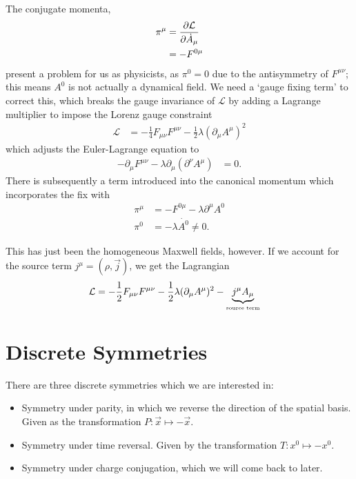 \documentclass[notes.tex]{subfiles}
\begin{document}
 The conjugate momenta,
 \begin{align*}
   \pi^\mu &= \pdv{\mathcal{L}}{\dot{A}_\mu}\\&=-F^{0\mu}
 \end{align*}
present a problem for us as physicists, as $\pi^0 = 0$ due to the antisymmetry of $F^{\mu\nu}$; this means $A^0$ is not actually a dynamical field.
We need a `gauge fixing term' to correct this, which breaks the gauge invariance of $\mathcal{L}$ by adding a Lagrange multiplier to impose the Lorenz gauge constraint
\begin{align*}
  \mathcal{L} &= -\frac{1}{4}F_{\mu\nu}F^{\mu\nu} - \frac{1}{2}\lambda(\partial_\mu A^\mu)^2
\end{align*}
which adjusts the Euler-Lagrange equation to
\begin{align*}
  - \partial_\mu F^{\mu\nu} - \lambda \partial_\mu (\partial^\nu A^\mu) &= 0.
\end{align*}
There is subsequently a term introduced into the canonical momentum which incorporates the fix with
\begin{align*}
  \pi^\mu &= -F^{0\mu} - \lambda \partial^\mu A^0\\
  \pi^0 &= - \lambda \dot{A^0} \neq 0.
\end{align*}

This has just been the homogeneous Maxwell fields, however.
If we account for the source term $j^\mu = (\rho, \vec{j})$, we get the Lagrangian
\begin{align*}
  \mathcal{L} &= -\frac{1}{2} F_{\mu\nu}F^{\mu\nu} - \frac{1}{2}\lambda(\partial_\mu A^\mu)^2 - \underbrace{j^\mu A_\mu}_{\text{\tiny source term}}
\end{align*}

\section{Discrete Symmetries}
There are three discrete symmetries which we are interested in:
\begin{itemize}
  \item Symmetry under parity, in which we reverse the direction of the spatial basis. Given as the transformation $P: \vec{x} \mapsto -\vec{x}$.
  \item Symmetry under time reversal. Given by the transformation $T: x^0 \mapsto -x^0$.
  \item Symmetry under charge conjugation, which we will come back to later.
\end{itemize}
\end{document}
